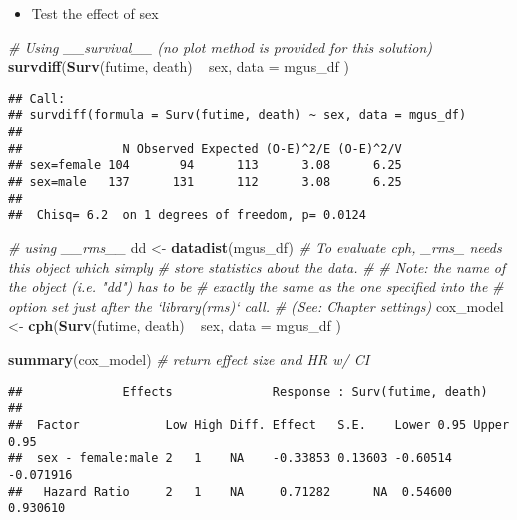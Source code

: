 \documentclass[]{book}
\newenvironment{Shaded}{\begin{snugshade}}{\end{snugshade}}
\newcommand{\KeywordTok}[1]{\textcolor[rgb]{0.13,0.29,0.53}{\textbf{{#1}}}}
\newcommand{\DataTypeTok}[1]{\textcolor[rgb]{0.13,0.29,0.53}{{#1}}}
\newcommand{\StringTok}[1]{\textcolor[rgb]{0.31,0.60,0.02}{{#1}}}
\newcommand{\CommentTok}[1]{\textcolor[rgb]{0.56,0.35,0.01}{\textit{{#1}}}}
\newcommand{\NormalTok}[1]{{#1}}
\providecommand{\tightlist}{%
  \setlength{\itemsep}{0pt}\setlength{\parskip}{0pt}}
\theoremstyle{definition}
\theoremstyle{definition}
\theoremstyle{definition}
\theoremstyle{remark}
\begin{document}
\begin{itemize}
\tightlist
\item
  Test the effect of sex
\end{itemize}

\begin{Shaded}
\begin{Highlighting}[]
\CommentTok{# Using __survival__ (no plot method is provided for this solution)}
\KeywordTok{survdiff}\NormalTok{(}\KeywordTok{Surv}\NormalTok{(futime, death) ~}\StringTok{ }\NormalTok{sex,}
  \DataTypeTok{data =} \NormalTok{mgus_df}
\NormalTok{)}
\end{Highlighting}
\end{Shaded}

\begin{verbatim}
## Call:
## survdiff(formula = Surv(futime, death) ~ sex, data = mgus_df)
## 
##              N Observed Expected (O-E)^2/E (O-E)^2/V
## sex=female 104       94      113      3.08      6.25
## sex=male   137      131      112      3.08      6.25
## 
##  Chisq= 6.2  on 1 degrees of freedom, p= 0.0124
\end{verbatim}

\begin{Shaded}
\begin{Highlighting}[]
\CommentTok{# using __rms__}
\NormalTok{dd <-}\StringTok{ }\KeywordTok{datadist}\NormalTok{(mgus_df)  }\CommentTok{# To evaluate cph, _rms_ needs this object which simply}
                         \CommentTok{# store statistics about the data.}
                         \CommentTok{# }
                         \CommentTok{# Note: the name of the object (i.e. "dd") has to be }
                         \CommentTok{#       exactly the same as the one specified into the}
                         \CommentTok{#       option set just after the `library(rms)` call.}
                         \CommentTok{#       (See: Chapter settings) }
\NormalTok{cox_model <-}\StringTok{ }\KeywordTok{cph}\NormalTok{(}\KeywordTok{Surv}\NormalTok{(futime, death) ~}\StringTok{ }\NormalTok{sex,}
  \DataTypeTok{data  =} \NormalTok{mgus_df}
\NormalTok{)}

\KeywordTok{summary}\NormalTok{(cox_model)                             }\CommentTok{# return effect size and HR w/ CI}
\end{Highlighting}
\end{Shaded}

\begin{verbatim}
##              Effects              Response : Surv(futime, death) 
## 
##  Factor            Low High Diff. Effect   S.E.    Lower 0.95 Upper 0.95
##  sex - female:male 2   1    NA    -0.33853 0.13603 -0.60514   -0.071916 
##   Hazard Ratio     2   1    NA     0.71282      NA  0.54600    0.930610
\end{verbatim}
\end{document}
